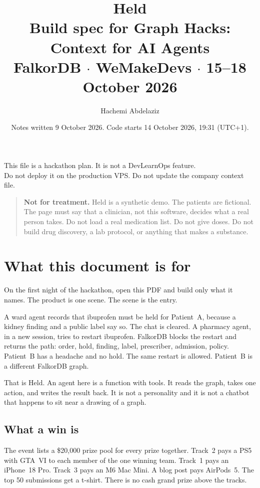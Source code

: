 \documentclass[11pt,a4paper]{article}
\title{%
  \textbf{Held}\\[0.4em]
  \large Build spec for Graph Hacks: Context for AI Agents\\[0.3em]
  \normalsize FalkorDB $\cdot$ WeMakeDevs $\cdot$ 15--18 October 2026
}
\author{Hachemi Abdelaziz}
\date{Notes written 9 October 2026. Code starts 14 October 2026, 19:31 (UTC+1).}
\begin{document}
\maketitle
\begin{center}
\small
This file is a hackathon plan. It is not a DevLearnOps feature.\\
Do not deploy it on the production VPS. Do not update the company context file.
\end{center}

\tableofcontents
\vspace{1em}

\begin{quote}
\textbf{Not for treatment.}
Held is a synthetic demo. The patients are fictional.
The page must say that a clinician, not this software, decides what a real person takes.
Do not load a real medication list. Do not give doses. Do not build drug discovery, a lab protocol, or anything that makes a substance.
\end{quote}

\section{What this document is for}

On the first night of the hackathon, open this PDF and build only what it names.
The product is one scene. The scene is the entry.

A ward agent records that ibuprofen must be held for Patient~A, because a kidney finding and a public label say so.
The chat is cleared.
A pharmacy agent, in a new session, tries to restart ibuprofen.
FalkorDB blocks the restart and returns the path: order, hold, finding, label, prescriber, admission, policy.
Patient~B has a headache and no hold. The same restart is allowed. Patient~B is a different FalkorDB graph.

That is Held. An agent here is a function with tools. It reads the graph, takes one action, and writes the result back. It is not a personality and it is not a chatbot that happens to sit near a drawing of a graph.

\subsection{What a win is}

The event lists a \$20{,}000 prize pool for every prize together.
Track~2 pays a PS5 with GTA~VI to each member of the one winning team.
Track~1 pays an iPhone~18 Pro. Track~3 pays an M6 Mac Mini.
A blog post pays AirPods~5. The top 50 submissions get a t-shirt.
There is no cash grand prize above the tracks.
\end{document}
